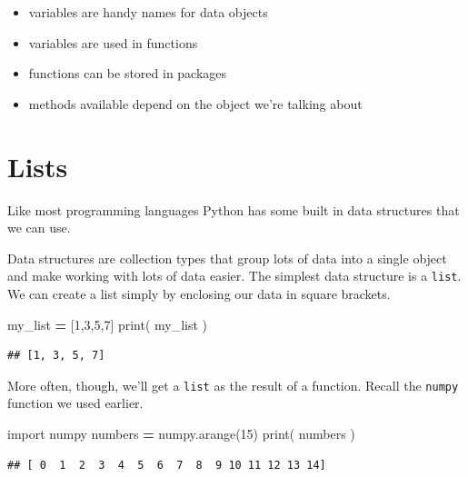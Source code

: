 \documentclass[]{book}
\newenvironment{Shaded}{\begin{snugshade}}{\end{snugshade}}
\newcommand{\BuiltInTok}[1]{#1}
\newcommand{\DecValTok}[1]{\textcolor[rgb]{0.00,0.00,0.81}{#1}}
\newcommand{\ImportTok}[1]{#1}
\newcommand{\NormalTok}[1]{#1}
\newcommand{\OperatorTok}[1]{\textcolor[rgb]{0.81,0.36,0.00}{\textbf{#1}}}
\providecommand{\tightlist}{%
  \setlength{\itemsep}{0pt}\setlength{\parskip}{0pt}}
\theoremstyle{definition}
\theoremstyle{definition}
\theoremstyle{definition}
\theoremstyle{remark}
\begin{document}
\begin{itemize}
\tightlist
\item
  variables are handy names for data objects
\item
  variables are used in functions
\item
  functions can be stored in packages
\item
  methods available depend on the object we're talking about
\end{itemize}

\hypertarget{lists}{%
\section{Lists}\label{lists}}

Like most programming languages Python has some built in data structures
that we can use.

Data structures are collection types that group lots of data into a
single object and make working with lots of data easier. The simplest
data structure is a \texttt{list}. We can create a list simply by
enclosing our data in square brackets.

\begin{Shaded}
\begin{Highlighting}[]
\NormalTok{my_list }\OperatorTok{=}\NormalTok{ [}\DecValTok{1}\NormalTok{,}\DecValTok{3}\NormalTok{,}\DecValTok{5}\NormalTok{,}\DecValTok{7}\NormalTok{]}
\BuiltInTok{print}\NormalTok{( my_list )}
\end{Highlighting}
\end{Shaded}

\begin{verbatim}
## [1, 3, 5, 7]
\end{verbatim}

More often, though, we'll get a \texttt{list} as the result of a
function. Recall the \texttt{numpy} function we used earlier.

\begin{Shaded}
\begin{Highlighting}[]
\ImportTok{import}\NormalTok{ numpy}
\NormalTok{numbers }\OperatorTok{=}\NormalTok{ numpy.arange(}\DecValTok{15}\NormalTok{)}
\BuiltInTok{print}\NormalTok{( numbers )}
\end{Highlighting}
\end{Shaded}

\begin{verbatim}
## [ 0  1  2  3  4  5  6  7  8  9 10 11 12 13 14]
\end{verbatim}
\end{document}
